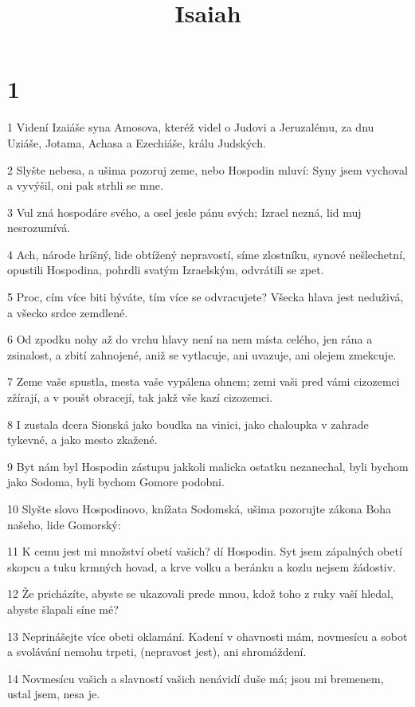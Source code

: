 

\title{Isaiah}

\chapter{1}

\par 1 Videní Izaiáše syna Amosova, kteréž videl o Judovi a Jeruzalému, za dnu Uziáše, Jotama, Achasa a Ezechiáše, králu Judských.
\par 2 Slyšte nebesa, a ušima pozoruj zeme, nebo Hospodin mluví: Syny jsem vychoval a vyvýšil, oni pak strhli se mne.
\par 3 Vul zná hospodáre svého, a osel jesle pánu svých; Izrael nezná, lid muj nesrozumívá.
\par 4 Ach, národe hríšný, lide obtížený nepravostí, síme zlostníku, synové nešlechetní, opustili Hospodina, pohrdli svatým Izraelským, odvrátili se zpet.
\par 5 Proc, cím více biti býváte, tím více se odvracujete? Všecka hlava jest neduživá, a všecko srdce zemdlené.
\par 6 Od zpodku nohy až do vrchu hlavy není na nem místa celého, jen rána a zsinalost, a zbití zahnojené, aniž se vytlacuje, ani uvazuje, ani olejem zmekcuje.
\par 7 Zeme vaše spustla, mesta vaše vypálena ohnem; zemi vaši pred vámi cizozemci zžírají, a v poušt obracejí, tak jakž vše kazí cizozemci.
\par 8 I zustala dcera Sionská jako boudka na vinici, jako chaloupka v zahrade tykevné, a jako mesto zkažené.
\par 9 Byt nám byl Hospodin zástupu jakkoli malicka ostatku nezanechal, byli bychom jako Sodoma, byli bychom Gomore podobni.
\par 10 Slyšte slovo Hospodinovo, knížata Sodomská, ušima pozorujte zákona Boha našeho, lide Gomorský:
\par 11 K cemu jest mi množství obetí vašich? dí Hospodin. Syt jsem zápalných obetí skopcu a tuku krmných hovad, a krve volku a beránku a kozlu nejsem žádostiv.
\par 12 Že pricházíte, abyste se ukazovali prede mnou, kdož toho z ruky vaší hledal, abyste šlapali síne mé?
\par 13 Neprinášejte více obeti oklamání. Kadení v ohavnosti mám, novmesícu a sobot a svolávání nemohu trpeti, (nepravost jest), ani shromáždení.
\par 14 Novmesícu vašich a slavností vašich nenávidí duše má; jsou mi bremenem, ustal jsem, nesa je.
